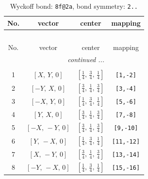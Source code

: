 \documentclass[fleqn,8pt]{jsarticle}
\begin{document}
\begin{longtable}{cccc}
\caption{Wyckoff bond: {\tt 8f@2a}, bond symmetry: {\tt 2..}}
 \\
 \hline \hline
No. & vector & center & mapping \\ \hline \endfirsthead

\multicolumn{3}{l}{\tablename\ \thetable{}} \\
 \hline \hline
No. & vector & center & mapping \\ \hline \endhead

 \hline \hline
\multicolumn{3}{r}{\footnotesize\it continued ...} \\ \endfoot

 \hline \hline
\multicolumn{3}{r}{} \\ \endlastfoot

1 & $\left[ X,\, Y,\, 0 \right]$ & $\left[ \frac{1}{4},\, \frac{3}{4},\, \frac{1}{4} \right]$ & {\tt [1,-2]} \\ \hline
2 & $\left[ - Y,\, X,\, 0 \right]$ & $\left[ \frac{3}{4},\, \frac{1}{4},\, \frac{3}{4} \right]$ & {\tt [3,-4]} \\ \hline
3 & $\left[ - X,\, Y,\, 0 \right]$ & $\left[ \frac{1}{4},\, \frac{3}{4},\, \frac{1}{4} \right]$ & {\tt [5,-6]} \\ \hline
4 & $\left[ Y,\, X,\, 0 \right]$ & $\left[ \frac{3}{4},\, \frac{1}{4},\, \frac{3}{4} \right]$ & {\tt [7,-8]} \\ \hline
5 & $\left[ - X,\, - Y,\, 0 \right]$ & $\left[ \frac{3}{4},\, \frac{1}{4},\, \frac{3}{4} \right]$ & {\tt [9,-10]} \\ \hline
6 & $\left[ Y,\, - X,\, 0 \right]$ & $\left[ \frac{1}{4},\, \frac{3}{4},\, \frac{1}{4} \right]$ & {\tt [11,-12]} \\ \hline
7 & $\left[ X,\, - Y,\, 0 \right]$ & $\left[ \frac{3}{4},\, \frac{1}{4},\, \frac{3}{4} \right]$ & {\tt [13,-14]} \\ \hline
8 & $\left[ - Y,\, - X,\, 0 \right]$ & $\left[ \frac{1}{4},\, \frac{3}{4},\, \frac{1}{4} \right]$ & {\tt [15,-16]} \\
\end{longtable}
\renewcommand{\arraystretch}{1.2}
\end{document}
